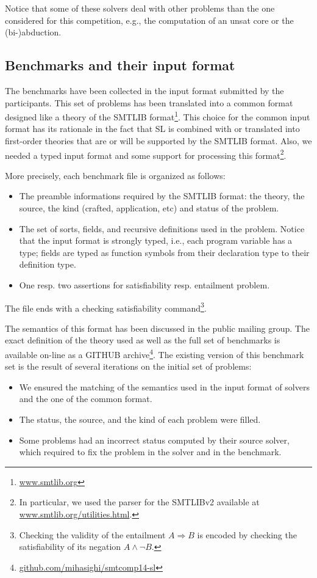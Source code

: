 \documentclass{llncs}
\newcommand{\limp}{\Rightarrow}
\newcommand{\SLEEK}{\textsc{Sleek}}
\begin{document}
Notice that some of these solvers deal with other problems than the one considered for this competition, e.g., the computation of an unsat core or the (bi-)abduction.


\subsection{Benchmarks and their input format}
The benchmarks have been collected in the input format submitted by the participants.
This set of problems has been translated into a common format designed like a theory of the SMTLIB format\footnote{\url{www.smtlib.org}}. 
This choice for the common input format has its rationale in 
the fact that SL is combined with or translated into first-order theories that are or will be supported by the SMTLIB format.
Also, we needed a typed input format and some support for processing this format\footnote{In particular, we used the parser for the SMTLIBv2 available at \url{www.smtlib.org/utilities.html}.}.
 
More precisely, each benchmark file is organized as follows:
\begin{itemize}
\item The preamble informations required by the SMTLIB format: the theory, the source,  the kind (crafted, application, etc) and status of the problem. 
\item The set of sorts, fields, and recursive definitions used in the problem. Notice that the input format is strongly typed, i.e., each program variable has a type; 
fields are typed as function symbols from their declaration type to their definition type. 
\item One resp. two assertions for satisfiability resp. entailment problem. 
\end{itemize}
The file ends with a checking satisfiability command\footnote{Checking the validity of the entailment $A\limp B$ is encoded by checking the satisfiability of its negation $A \land \lnot B$.}.

The semantics of this format has been discussed in the public mailing group. 
The exact definition of the theory used as well as the full set of benchmarks is available on-line as a GITHUB archive\footnote{\url{github.com/mihasighi/smtcomp14-sl}}.
The existing version of this benchmark set is the result of several iterations on the initial set of problems:
\begin{itemize}
\item We ensured the matching of the semantics used in the input format of solvers and the one of the common format. 
\item The status, the source, and the kind of each problem were filled.
\item Some problems had an incorrect status computed by their source solver, which required to fix the problem in the solver and in the benchmark.
\end{itemize}
\end{document}
